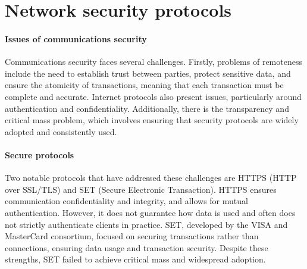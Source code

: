 \section{Network security protocols}

\paragraph*{Issues of communications security}
Communications security faces several challenges. 
Firstly, problems of remoteness include the need to establish trust between parties, protect sensitive data, and ensure the atomicity of transactions, meaning that each transaction must be complete and accurate. 
Internet protocols also present issues, particularly around authentication and confidentiality. 
Additionally, there is the transparency and critical mass problem, which involves ensuring that security protocols are widely adopted and consistently used.

\paragraph*{Secure protocols}
Two notable protocols that have addressed these challenges are HTTPS (HTTP over SSL/TLS) and SET (Secure Electronic Transaction). 
HTTPS ensures communication confidentiality and integrity, and allows for mutual authentication.
However, it does not guarantee how data is used and often does not strictly authenticate clients in practice. 
SET, developed by the VISA and MasterCard consortium, focused on securing transactions rather than connections, ensuring data usage and transaction security. 
Despite these strengths, SET failed to achieve critical mass and widespread adoption.

